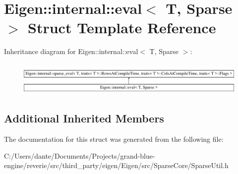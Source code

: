 \hypertarget{struct_eigen_1_1internal_1_1eval_3_01_t_00_01_sparse_01_4}{}\section{Eigen\+::internal\+::eval$<$ T, Sparse $>$ Struct Template Reference}
\label{struct_eigen_1_1internal_1_1eval_3_01_t_00_01_sparse_01_4}
Inheritance diagram for Eigen\+::internal\+::eval$<$ T, Sparse $>$\+:\begin{figure}[H]
\begin{center}
\leavevmode
\includegraphics[height=1.654358cm]{struct_eigen_1_1internal_1_1eval_3_01_t_00_01_sparse_01_4}
\end{center}
\end{figure}
\subsection*{Additional Inherited Members}


The documentation for this struct was generated from the following file\+:\begin{DoxyCompactItemize}
\item 
C\+:/\+Users/dante/\+Documents/\+Projects/grand-\/blue-\/engine/reverie/src/third\+\_\+party/eigen/\+Eigen/src/\+Sparse\+Core/Sparse\+Util.\+h\end{DoxyCompactItemize}

